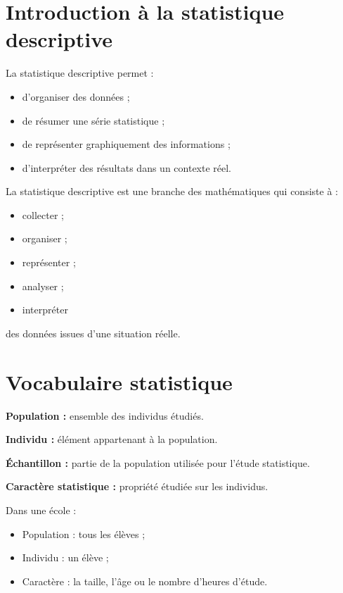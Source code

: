 \section{Introduction à la statistique descriptive}

\begin{cadreobjectif}
La statistique descriptive permet :
\begin{itemize}
    \item d’organiser des données ;
    \item de résumer une série statistique ;
    \item de représenter graphiquement des informations ;
    \item d’interpréter des résultats dans un contexte réel.
\end{itemize}
\end{cadreobjectif}

\begin{cadretheorie}
La statistique descriptive est une branche des mathématiques qui consiste à :
\begin{itemize}
    \item collecter ;
    \item organiser ;
    \item représenter ;
    \item analyser ;
    \item interpréter
\end{itemize}
des données issues d’une situation réelle.
\end{cadretheorie}

\section{Vocabulaire statistique}

\begin{cadretheorie}
\textbf{Population :} ensemble des individus étudiés.

\medskip

\textbf{Individu :} élément appartenant à la population.

\medskip

\textbf{Échantillon :} partie de la population utilisée pour l’étude statistique.

\medskip

\textbf{Caractère statistique :} propriété étudiée sur les individus.
\end{cadretheorie}

\begin{cadreexemple}
Dans une école :

\begin{itemize}
    \item Population : tous les élèves ;
    \item Individu : un élève ;
    \item Caractère : la taille, l’âge ou le nombre d’heures d’étude.
\end{itemize}
\end{cadreexemple}

